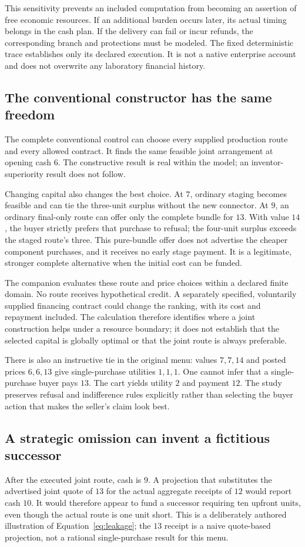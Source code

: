 This sensitivity prevents an included computation from becoming an assertion of free economic resources. If an additional burden occurs later, its actual timing belongs in the cash plan. If the delivery can fail or incur refunds, the corresponding branch and protections must be modeled. The fixed deterministic trace establishes only its declared execution. It is not a native enterprise account and does not overwrite any laboratory financial history.

\subsection{The conventional constructor has the same freedom}
The complete conventional control can choose every supplied production route and every allowed contract. It finds the same feasible joint arrangement at opening cash $6$. The constructive result is real within the model; an inventor-superiority result does not follow.

Changing capital also changes the best choice. At $7$, ordinary staging becomes feasible and can tie the three-unit surplus without the new connector. At $9$, an ordinary final-only route can offer only the complete bundle for $13$. With value $14$, the buyer strictly prefers that purchase to refusal; the four-unit surplus exceeds the staged route's three. This pure-bundle offer does not advertise the cheaper component purchases, and it receives no early stage payment. It is a legitimate, stronger complete alternative when the initial cost can be funded.

The companion evaluates these route and price choices within a declared finite domain. No route receives hypothetical credit. A separately specified, voluntarily supplied financing contract could change the ranking, with its cost and repayment included. The calculation therefore identifies where a joint construction helps under a resource boundary; it does not establish that the selected capital is globally optimal or that the joint route is always preferable.

There is also an instructive tie in the original menu: values $7,7,14$ and posted prices $6,6,13$ give single-purchase utilities $1,1,1$. One cannot infer that a single-purchase buyer pays $13$. The cart yields utility $2$ and payment $12$. The study preserves refusal and indifference rules explicitly rather than selecting the buyer action that makes the seller's claim look best.

\subsection{A strategic omission can invent a fictitious successor}
After the executed joint route, cash is $9$. A projection that substitutes the advertised joint quote of $13$ for the actual aggregate receipts of $12$ would report cash $10$. It would therefore appear to fund a successor requiring ten upfront units, even though the actual route is one unit short. This is a deliberately authored illustration of Equation~\ref{eq:leakage}; the $13$ receipt is a naive quote-based projection, not a rational single-purchase result for this menu.


